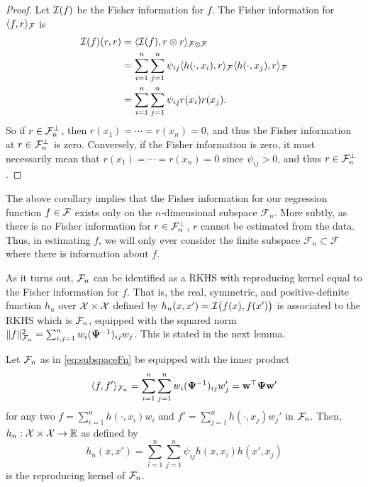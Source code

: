 \begin{proof}  
  Let ${\mathcal I}(f)$ be the Fisher information for $f$.
  The Fisher information for $\langle f,r\rangle_{\mathcal F}$ is
  \begin{align*}
    {\mathcal I}(f)(r,r) 
    &= \langle{\mathcal I}(f), r\otimes r\rangle_{{\mathcal F}\otimes{\mathcal F}} \\
    &= \sum_{i=1}^n\sum_{j=1}^n \psi_{ij} \langle h(\cdot,x_i),r\rangle_{\mathcal F}\langle h(\cdot,x_j),r\rangle_{\mathcal F} \\
    &= \sum_{i=1}^n\sum_{j=1}^n \psi_{ij} r(x_i)r(x_j).
  \end{align*}
  So if $r\in{\mathcal F}_n^\bot$, then $r(x_1) = \cdots = r(x_n) = 0$, and thus the Fisher information at $r\in{\mathcal F}_n^\bot$ is zero.
  Conversely, if the Fisher information is zero, it must necessarily mean that $r(x_1) = \cdots = r(x_n) = 0$ since $\psi_{ij}>0$, and thus $r\in{\mathcal F}_n^\bot$.
\end{proof}

The above corollary implies that the Fisher information for our regression function $f\in{\mathcal F}$ exists only on the $n$-dimensional subspace $\mathcal F_n$. 
More subtly, as there is no Fisher information for $r\in{\mathcal F}_n^\bot$, $r$ cannot be estimated from the data.
Thus, in estimating $f$, we will only ever consider the finite subspace $\mathcal F_n \subset \mathcal F$ where there is information about $f$.

As it turns out, ${\mathcal F}_n$ can be identified as a RKHS with reproducing kernel equal to the Fisher information for $f$.
That is, the real, symmetric, and positive-definite function $h_n$ over ${\mathcal X}\times{\mathcal X}$ defined by $h_n(x,x') = {\mathcal I}\big(f(x),f(x')\big)$ is associated to the RKHS which is ${\mathcal F}_n$, equipped with the squared norm 
$\lVert f\rVert_{{\mathcal F}_n}^2 = \sum_{i,j=1}^n w_i({\bm\Psi}^{-1})_{ij}w_j$.
This is stated in the next lemma.

\begin{lemma}\label{thm:subspaceFn}
  Let ${\mathcal F}_n$ as in \cref{eq:subspaceFn} be equipped with the inner product
  \begin{align}\label{eq:Fninnerprod}
    \langle f, f'\rangle_{{\mathcal F}_n} = \sum_{i=1}^n\sum_{j=1}^n w_i({\bm\Psi}^{-1})_{ij}w_j' = {\mathbf w}^\top{\bm\Psi}{\mathbf w}' 
  \end{align}
  for any two $f=\sum_{i=1}^n h(\cdot,x_i)w_i$ and $f'=\sum_{j=1}^n h(\cdot,x_j)w_j'$ in ${\mathcal F}_n$.
  Then, $h_n:{\mathcal X}\times{\mathcal X}\to\mathbb{R}$ as defined by
  \[
    h_n(x,x') = \sum_{i=1}^n\sum_{j=1}^n \psi_{ij}h(x,x_i)h(x',x_j)
  \]
  is the reproducing kernel of ${\mathcal F}_n$.
\end{lemma}

